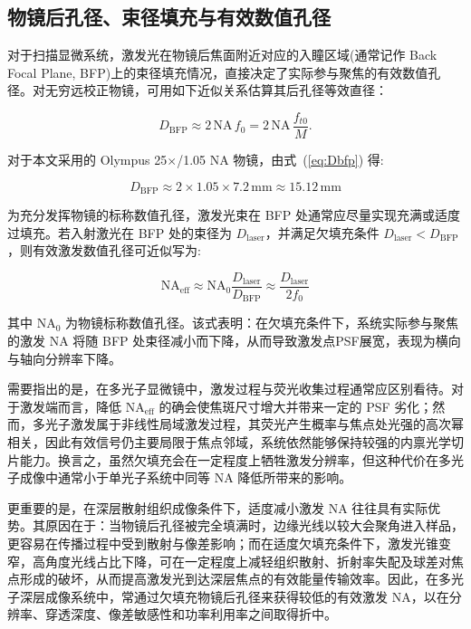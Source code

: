 \subsection{物镜后孔径、束径填充与有效数值孔径}\label{2.4.2}

对于扫描显微系统，激发光在物镜后焦面附近对应的入瞳区域(通常记作 Back Focal Plane, BFP)上的束径填充情况，直接决定了实际参与聚焦的有效数值孔径。对无穷远校正物镜，可用如下近似关系估算其后孔径等效直径：

\begin{equation}
  D_{\mathrm{BFP}}\approx 2\,\mathrm{NA}\,f_0
  =2\,\mathrm{NA}\,\frac{f_{t0}}{M}.
  \label{eq:Dbfp}
\end{equation}

对于本文采用的 Olympus 25$\times$/1.05 NA 物镜，由式~(\ref{eq:Dbfp}) 得:

\begin{equation}
  D_{\mathrm{BFP}}\approx 2\times1.05\times7.2\,\mathrm{mm}\approx 15.12\,\mathrm{mm}
  \label{eq:Dbfp_olympus}
\end{equation}

为充分发挥物镜的标称数值孔径，激发光束在 BFP 处通常应尽量实现充满或适度过填充。若入射激光在 BFP 处的束径为 $D_{\mathrm{laser}}$，并满足欠填充条件 $D_{\mathrm{laser}}<D_{\mathrm{BFP}}$，则有效激发数值孔径可近似写为:

\begin{equation}
  \mathrm{NA}_{\mathrm{eff}}\approx \mathrm{NA}_{0}\frac{D_{\mathrm{laser}}}{D_{\mathrm{BFP}}}
  \approx \frac{D_{\mathrm{laser}}}{2f_0}
  \label{eq:NAeff}
\end{equation}

其中 $\mathrm{NA}_{0}$ 为物镜标称数值孔径。该式表明：在欠填充条件下，系统实际参与聚焦的激发 NA 将随 BFP 处束径减小而下降，从而导致激发点PSF展宽，表现为横向与轴向分辨率下降。

需要指出的是，在多光子显微镜中，激发过程与荧光收集过程通常应区别看待。对于激发端而言，降低 $\mathrm{NA}_{\mathrm{eff}}$ 的确会使焦斑尺寸增大并带来一定的 PSF 劣化；然而，多光子激发属于非线性局域激发过程，其荧光产生概率与焦点处光强的高次幂相关，因此有效信号仍主要局限于焦点邻域，系统依然能够保持较强的内禀光学切片能力。换言之，虽然欠填充会在一定程度上牺牲激发分辨率，但这种代价在多光子成像中通常小于单光子系统中同等 NA 降低所带来的影响。

更重要的是，在深层散射组织成像条件下，适度减小激发 NA 往往具有实际优势\cite{RN372}。其原因在于：当物镜后孔径被完全填满时，边缘光线以较大会聚角进入样品，更容易在传播过程中受到散射与像差影响；而在适度欠填充条件下，激发光锥变窄，高角度光线占比下降，可在一定程度上减轻组织散射、折射率失配及球差对焦点形成的破坏，从而提高激发光到达深层焦点的有效能量传输效率。因此，在多光子深层成像系统中，常通过欠填充物镜后孔径来获得较低的有效激发 NA，以在分辨率、穿透深度、像差敏感性和功率利用率之间取得折中。

